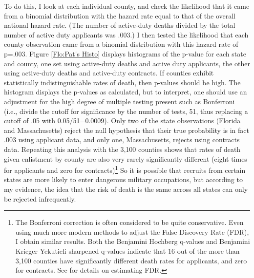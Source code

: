 \documentclass[12pt] {article}
\begin{document}
To do this, I look at each individual county, and check the likelihood that it came from a binomial distribution with the hazard rate equal to that of the overall national hazard rate. (The number of active-duty deaths divided by the total number
of active duty applicants was .003.) I then tested the likelihood
that each county observation came from a binomial distribution with this
hazard rate of p=.003. Figure \ref{Flo:Pat's Histo} displays
histograms of the p-value for each state and county, one set using active-duty deaths
and active duty applicants, the other using active-duty deaths and
active-duty contracts. If counties exhibit statistically indistinguishable rates of death, then p-values should be high. The histogram displays the p-values as calculated,
but to interpret, one should use an adjustment for the high degree of multiple testing present such as Bonferroni (i.e., divide the cutoff for significance by the number of tests, 51, thus replacing a cutoff of .05 with 0.05/51=0.0009). Only two
of the state observations (Florida and Massachusetts) reject the null
hypothesis that their true probability is in fact .003 using applicant
data, and only one, Massachusetts, rejects using contracts data. Repeating this analysis with the 3,100 counties shows that rates of death given enlistment by county are also very rarely significantly different (eight times for applicants and zero for contracts)\footnote{The Bonferroni correction is often considered to be quite conservative. Even using much more modern methods to adjust the False Discovery Rate (FDR), I obtain similar results. Both the Benjamini Hochberg q-values and Benjamini Krieger Yekutieli sharpened q-values indicate that 16 out of the more than 3,100 counties have significantly different death rates for applicants, and zero for contracts. See \cite{BenHoch1995, BKY2006, Anderson2008} for details on estimating FDR.} So it is possible that recruits from certain states are more likely to enter dangerous military occupations, but according to my evidence, the idea that the risk of death is the same across all states can only be rejected infrequently. 
\end{document}
